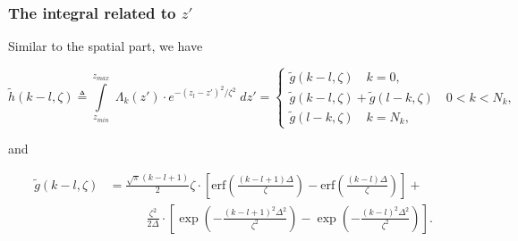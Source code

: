 \documentclass[preprint,12pt]{elsarticle}
\begin{document}
\subsubsection{The integral related to $z'$}
\label{integral_z_spectral}
 Similar to the spatial part, we have
 \begin{small}
 \begin{equation}
 \widetilde{h}(k-l,\zeta) \triangleq \int \limits^{z_{max}}_{z_{min}}\; \Lambda_k(z') \cdot e^{-( z_l - z')^2/\zeta^2} \; dz'
 = \left\{ \begin{array}{ll} 
\widetilde{g}(k-l,\zeta) \quad k = 0,\\
\widetilde{g}(k-l,\zeta) + \widetilde{g}(l-k,\zeta) \quad 0 < k< N_k ,\\
\widetilde{g}(l-k,\zeta) \quad k = N_k ,
\end{array}\right.
\end{equation}
\end{small}
and 
\begin{small}
\begin{equation}
\begin{split}
\widetilde{g}(k-l,\zeta) &= \frac{\sqrt{\pi}(k-l+1) }{2} \zeta \cdot \left[ \text{erf}\left( \frac{(k-l+1)\Delta}{\zeta} \right) - \text{erf}\left( \frac{(k-l)\Delta}{\zeta} \right) \right] + \\&\qquad \quad \frac{\zeta^2}{2\Delta}\cdot  \left[ \exp \left( -\frac{(k-l+1)^2\Delta^2}{\zeta^2} \right) - \exp \left( -\frac{(k-l)^2\Delta^2}{\zeta^2} \right) \right] .
\end{split}
\label{widetilde_g}
\end{equation}
\end{small}
\end{document}
